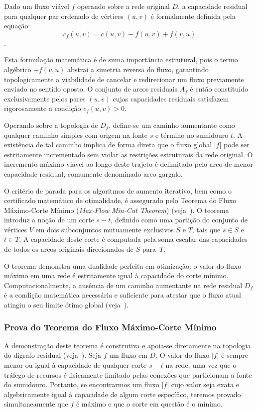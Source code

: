 \documentclass[12pt,a4paper]{article}
\begin{document}
Dado um fluxo viável $f$ operando sobre a rede original $D$, a capacidade residual para qualquer par ordenado de vértices $(u,v)$ é formalmente definida pela equação:
$$c_f(u,v) = c(u,v) - f(u,v) + f(v,u)$$.

Esta formulação matemática é de suma importância estrutural, pois o termo algébrico $+ f(v,u)$ abstrai a simetria reversa do fluxo, garantindo topologicamente a viabilidade de cancelar e redirecionar um fluxo previamente enviado no sentido oposto. O conjunto de arcos residuais $A_f$ é então constituído exclusivamente pelos pares $(u,v)$ cujas capacidades residuais satisfazem rigorosamente a condição $c_f(u,v) > 0$.

Operando sobre a topologia de $D_f$, define-se um caminho aumentante como qualquer caminho simples com origem na fonte $s$ e término no sumidouro $t$. A existência de tal caminho implica de forma direta que o fluxo global $|f|$ pode ser estritamente incrementado sem violar as restrições estruturais da rede original. O incremento máximo viável ao longo deste trajeto é delimitado pelo arco de menor capacidade residual, comumente denominado arco gargalo.

O critério de parada para os algoritmos de aumento iterativo, bem como o certificado matemático de otimalidade, é assegurado pelo Teorema do Fluxo Máximo-Corte Mínimo (\textit{Max-Flow Min-Cut Theorem}) (veja~\cite{ford1956maximal}). O teorema introduz a noção de um corte $s-t$, definido como uma partição do conjunto de vértices $V$ em dois subconjuntos mutuamente exclusivos $S$ e $T$, tais que $s \in S$ e $t \in T$. A capacidade deste corte é computada pela soma escalar das capacidades de todos os arcos originais direcionados de $S$ para~$T$.

O teorema demonstra uma dualidade perfeita em otimização: o valor do fluxo máximo em uma rede é estritamente igual à capacidade do corte mínimo. Computacionalmente, a ausência de um caminho aumentante na rede residual $D_f$ é a condição matemática necessária e suficiente para atestar que o fluxo atual atingiu o seu limite ótimo global (veja~\cite{cook1998combinatorial}).

\subsubsection{Prova do Teorema do Fluxo Máximo-Corte Mínimo}

A demonstração deste teorema é construtiva e apoia-se diretamente na topologia do digrafo residual (veja~\cite{ford1956maximal, cook1998combinatorial}). Seja $f$ um fluxo em $D$. O valor do fluxo $|f|$ é sempre menor ou igual à capacidade de qualquer corte $s-t$ na rede, uma vez que o tráfego de recursos é fisicamente limitado pelas conexões que particionam a fonte do sumidouro. Portanto, se encontrarmos um fluxo $|f|$ cujo valor seja exata e algebricamente igual à capacidade de algum corte específico, teremos provado simultaneamente que $f$ é máximo e que o corte em questão é o mínimo.
\end{document}
